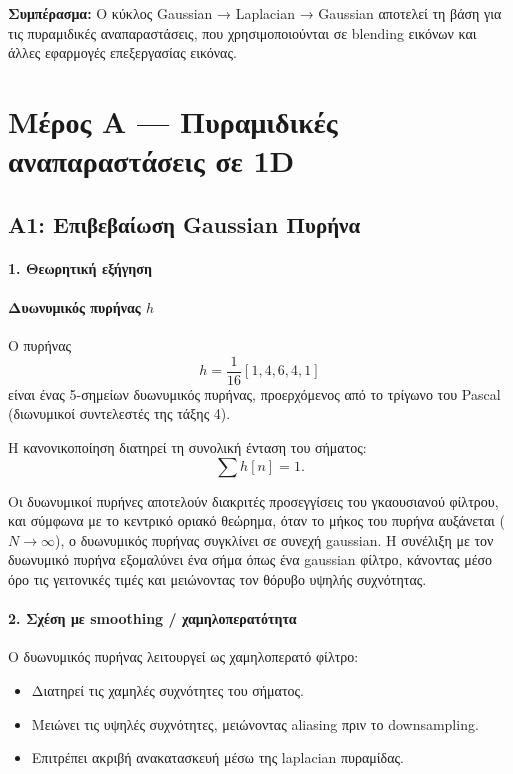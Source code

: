 \documentclass[12pt]{article}
\begin{document}
\textbf{Συμπέρασμα:} Ο κύκλος Gaussian → Laplacian → Gaussian αποτελεί τη βάση για τις πυραμιδικές αναπαραστάσεις, που χρησιμοποιούνται σε blending εικόνων και άλλες εφαρμογές επεξεργασίας εικόνας.


\section{Μέρος Α — Πυραμιδικές αναπαραστάσεις σε 1D }


\subsection{Α1: Επιβεβαίωση Gaussian Πυρήνα}

\paragraph{1. Θεωρητική εξήγηση}
\paragraph{Δυωνυμικός πυρήνας $h$}\mbox{} 

Ο πυρήνας
\[
h = \frac{1}{16}[1, 4, 6, 4, 1]
\]
είναι ένας 5-σημείων δυωνυμικός πυρήνας, προερχόμενος από το τρίγωνο του Pascal (διωνυμικοί συντελεστές της τάξης 4).  

Η κανονικοποίηση διατηρεί τη συνολική ένταση του σήματος:
\[
\sum h[n] = 1.
\]

Οι δυωνυμικοί πυρήνες αποτελούν διακριτές προσεγγίσεις του γκαουσιανού φίλτρου, και σύμφωνα με το κεντρικό οριακό θεώρημα, όταν το μήκος του πυρήνα αυξάνεται ($N \to \infty$), ο δυωνυμικός πυρήνας συγκλίνει σε συνεχή gaussian.  
Η συνέλιξη με τον δυωνυμικό πυρήνα εξομαλύνει ένα σήμα όπως ένα gaussian φίλτρο, κάνοντας μέσο όρο τις γειτονικές τιμές και μειώνοντας τον θόρυβο υψηλής συχνότητας.

\paragraph{2. Σχέση με smoothing / χαμηλοπερατότητα}\mbox{} 

Ο δυωνυμικός πυρήνας λειτουργεί ως χαμηλοπερατό φίλτρο:

\begin{itemize}
    \item Διατηρεί τις χαμηλές συχνότητες του σήματος.
    \item Μειώνει τις υψηλές συχνότητες, μειώνοντας aliasing πριν το downsampling.
    \item Επιτρέπει ακριβή ανακατασκευή μέσω της laplacian πυραμίδας.
\end{itemize}
\end{document}
